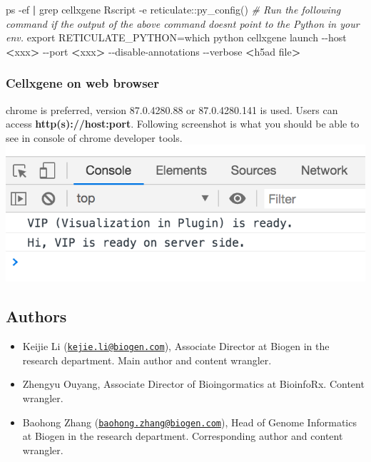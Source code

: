 \documentclass[
]{article}
\newenvironment{Shaded}{\begin{snugshade}}{\end{snugshade}}
\newcommand{\AttributeTok}[1]{\textcolor[rgb]{0.77,0.63,0.00}{#1}}
\newcommand{\BuiltInTok}[1]{#1}
\newcommand{\CommentTok}[1]{\textcolor[rgb]{0.56,0.35,0.01}{\textit{#1}}}
\newcommand{\ExtensionTok}[1]{#1}
\newcommand{\FunctionTok}[1]{\textcolor[rgb]{0.00,0.00,0.00}{#1}}
\newcommand{\KeywordTok}[1]{\textcolor[rgb]{0.13,0.29,0.53}{\textbf{#1}}}
\newcommand{\NormalTok}[1]{#1}
\newcommand{\OperatorTok}[1]{\textcolor[rgb]{0.81,0.36,0.00}{\textbf{#1}}}
\newcommand{\StringTok}[1]{\textcolor[rgb]{0.31,0.60,0.02}{#1}}
\newcommand{\VariableTok}[1]{\textcolor[rgb]{0.00,0.00,0.00}{#1}}
\providecommand{\tightlist}{%
  \setlength{\itemsep}{0pt}\setlength{\parskip}{0pt}}
\begin{document}
\begin{Shaded}
\begin{Highlighting}[]
\FunctionTok{ps} \AttributeTok{{-}ef} \KeywordTok{|} \FunctionTok{grep}\NormalTok{ cellxgene}
\ExtensionTok{Rscript} \AttributeTok{{-}e} \StringTok{\textquotesingle{}reticulate::py\_config()\textquotesingle{}}
\CommentTok{\# Run the following command if the output of the above command doesn\textquotesingle{}t point to the Python in your env.}
\BuiltInTok{export} \VariableTok{RETICULATE\_PYTHON=}\KeywordTok{\textasciigrave{}}\FunctionTok{which}\NormalTok{ python}\KeywordTok{\textasciigrave{}}
\ExtensionTok{cellxgene}\NormalTok{ launch }\AttributeTok{{-}{-}host} \OperatorTok{\textless{}}\NormalTok{xxx}\OperatorTok{\textgreater{}}\NormalTok{ {-}{-}port }\OperatorTok{\textless{}}\NormalTok{xxx}\OperatorTok{\textgreater{}}\NormalTok{ {-}{-}disable{-}annotations }\AttributeTok{{-}{-}verbose} \OperatorTok{\textless{}}\NormalTok{h5ad file}\OperatorTok{\textgreater{}}
\end{Highlighting}
\end{Shaded}

\hypertarget{cellxgene-on-web-browser}{%
\subsubsection{Cellxgene on web browser}\label{cellxgene-on-web-browser}}

chrome is preferred, version 87.0.4280.88 or 87.0.4280.141 is used. Users can access \textbf{http(s)://host:port}.
Following screenshot is what you should be able to see in console of chrome developer tools.
\includegraphics{cellonweb.png}

\hypertarget{authors}{%
\subsection{Authors}\label{authors}}

\begin{itemize}
\tightlist
\item
  Keijie Li (\href{mailto:kejie.li@biogen.com}{\nolinkurl{kejie.li@biogen.com}}), Associate Director at Biogen in the research department. Main author and content wrangler.
\item
  Zhengyu Ouyang, Associate Director of Bioingormatics at BioinfoRx. Content wrangler.
\item
  Baohong Zhang (\href{mailto:baohong.zhang@biogen.com}{\nolinkurl{baohong.zhang@biogen.com}}), Head of Genome Informatics at Biogen in the research department. Corresponding author and content wrangler.
\end{itemize}
\end{document}
